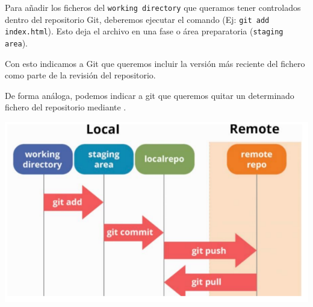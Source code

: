 \begin{minipage}{0.5\textwidth}
	Para añadir los ficheros del \texttt{working directory} que queramos tener controlados dentro del repositorio Git, deberemos ejecutar el comando  (Ej: \texttt{git add index.html}). Esto deja el archivo en una fase o área preparatoria (\texttt{staging area}).
	
	Con esto indicamos a Git que queremos incluir la versión más reciente del fichero como parte de la revisión del repositorio.
	
	De forma análoga, podemos indicar a git que queremos quitar un determinado fichero del repositorio mediante .
\end{minipage}\qquad\begin{minipage}{0.45\textwidth}
\begin{center}
	\includegraphics[width=\linewidth]{"Temas/Tema 1/screenshot006"}
\end{center}
\end{minipage}

